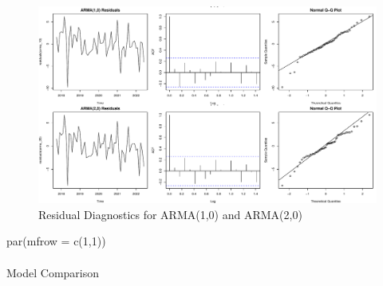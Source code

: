 \documentclass[
  11pt,
]{article}
\makeatletter
\let\oldparagraph\paragraph
\renewcommand{\paragraph}{
    \@ifstar
      \xxxParagraphStar
      \xxxParagraphNoStar
  }
\newcommand{\xxxParagraphStar}[1]{\oldparagraph*{#1}\mbox{}}
\newcommand{\xxxParagraphNoStar}[1]{\oldparagraph{#1}\mbox{}}
\newenvironment{Shaded}{\begin{snugshade}}{\end{snugshade}}
\newcommand{\AttributeTok}[1]{\textcolor[rgb]{0.40,0.45,0.13}{#1}}
\newcommand{\DecValTok}[1]{\textcolor[rgb]{0.68,0.00,0.00}{#1}}
\newcommand{\FunctionTok}[1]{\textcolor[rgb]{0.28,0.35,0.67}{#1}}
\newcommand{\NormalTok}[1]{\textcolor[rgb]{0.00,0.23,0.31}{#1}}
\makeatother
\begin{document}
\begin{figure}[H]

{\centering \includegraphics{project_files/figure-pdf/fig-arma-diagnostics-1.pdf}

}

\caption{Residual Diagnostics for ARMA(1,0) and ARMA(2,0)}

\end{figure}%

\begin{Shaded}
\begin{Highlighting}[]
\FunctionTok{par}\NormalTok{(}\AttributeTok{mfrow =} \FunctionTok{c}\NormalTok{(}\DecValTok{1}\NormalTok{,}\DecValTok{1}\NormalTok{))}
\end{Highlighting}
\end{Shaded}

\paragraph{Model Comparison}\label{model-comparison}
\end{document}
